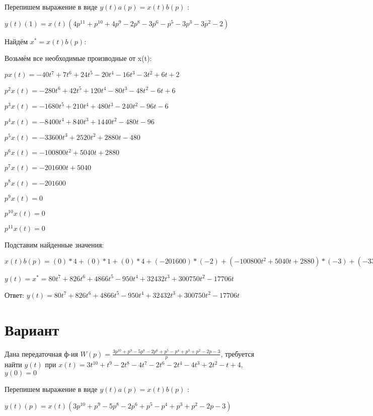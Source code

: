 \documentclass{article}
\begin{document}
{{{{{Перепишем выражение в виде $y(t)a(p)=x(t)b(p)$ :

$y(t)(1)=x(t)(4p^{11}+p^{10}+4p^{9}-2p^{8}-3p^{6}-p^{5}-3p^{3}-3p^{2}-2)$

Найдём $x^*=x(t)b(p)$:

Возьмём все необходимые производные от x(t):

$px(t)=-40t^{7}+7t^{6}+24t^{5}-20t^{4}-16t^{3}-3t^{2}+6t+2$

$p^2x(t)=-280t^{6}+42t^{5}+120t^{4}-80t^{3}-48t^{2}-6t+6$

$p^3x(t)=-1680t^{5}+210t^{4}+480t^{3}-240t^{2}-96t-6$

$p^4x(t)=-8400t^{4}+840t^{3}+1440t^{2}-480t-96$

$p^5x(t)=-33600t^{3}+2520t^{2}+2880t-480$

$p^6x(t)=-100800t^{2}+5040t+2880$

$p^7x(t)=-201600t+5040$

$p^8x(t)=-201600$

$p^9x(t)=0$

$p^10x(t)=0$

$p^11x(t)=0$

Подставим найденные значения:

$x(t)b(p) = (0)*4+(0)*1+(0)*4+(-201600)*(-2)+(-100800t^{2}+5040t+2880)*(-3)+(-33600t^{3}+2520t^{2}+2880t-480)*(-1)+(-1680t^{5}+210t^{4}+480t^{3}-240t^{2}-96t-6)*(-3)+(-280t^{6}+42t^{5}+120t^{4}-80t^{3}-48t^{2}-6t+6)*(-3)+(-40t^{7}+7t^{6}+24t^{5}-20t^{4}-16t^{3}-3t^{2}+6t+2)*(-2)=80t^{7}+826t^{6}+4866t^{5}-950t^{4}+32432t^{3}+300750t^{2}-17706t$





$y(t)=x^*=80t^{7}+826t^{6}+4866t^{5}-950t^{4}+32432t^{3}+300750t^{2}-17706t$

Ответ: $y(t) = 80t^{7}+826t^{6}+4866t^{5}-950t^{4}+32432t^{3}+300750t^{2}-17706t$

\section{Вариант}

Дана передаточная ф-ия $W(p)=\frac{3p^{10}+p^{9}-5p^{8}-2p^{6}+p^{5}-p^{4}+p^{3}+p^{2}-2p-3}{p}$, требуется найти $y(t)$ при $x(t)=3t^{10}+t^{9}-2t^{8}-4t^{7}-2t^{6}-2t^{4}-4t^{3}+2t^{2}-t+4$, $y(0)=0$

Перепишем выражение в виде $y(t)a(p)=x(t)b(p)$ :

$y(t)(p)=x(t)(3p^{10}+p^{9}-5p^{8}-2p^{6}+p^{5}-p^{4}+p^{3}+p^{2}-2p-3)$

}}}}}
\end{document}
